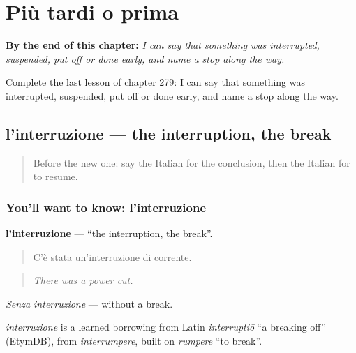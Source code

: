 
\chapter{Più tardi o prima}
\label{ch:it-piu-tardi-o-prima}

\begin{chapteropening}
\textbf{By the end of this chapter:} \emph{I can say that something was interrupted, suspended, put off or done early, and name a stop along the way.}

Complete the last lesson of chapter 279: I can say that something was interrupted, suspended, put off or done early, and name a stop along the way.
\end{chapteropening}

\section[l'interruzione]{l'interruzione — the interruption, the break}

\label{lesson:IT-C279-interruzione}



\begin{quote}
Before the new one: say the Italian for the conclusion, then the Italian for to resume.
\end{quote}

\subsection*{You'll want to know: l'interruzione}
\textbf{l'interruzione} — \textquotedblleft{}the interruption, the break\textquotedblright{}.

\begin{quote}
C'è stata un'interruzione di corrente.
\end{quote}

\begin{quote}
\emph{There was a power cut.}
\end{quote}

\emph{Senza interruzione} — without a break.

\begin{cousinweb}
\emph{interruzione} is a learned borrowing from Latin \emph{interruptiō} \textquotedblleft{}a breaking off\textquotedblright{} (EtymDB), from \emph{interrumpere}, built on \emph{rumpere} \textquotedblleft{}to break\textquotedblright{}.
\end{cousinweb}

